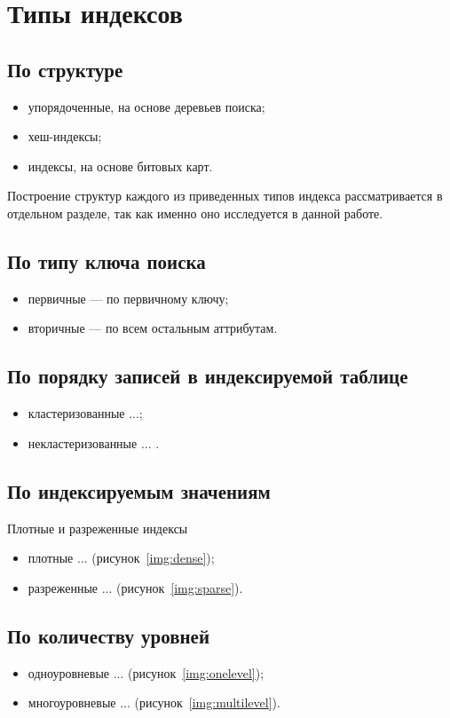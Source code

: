 \section{Типы индексов}

\subsection{По структуре}

\begin{itemize}
    \item упорядоченные, на основе деревьев поиска;
    \item хеш-индексы;
    \item индексы, на основе битовых карт.
\end{itemize}

Построение структур каждого из приведенных типов индекса рассматривается в
отдельном разделе, так как именно оно исследуется в данной работе.

\subsection{По типу ключа поиска}

\begin{itemize}
    \item первичные --- по первичному ключу;
    \item вторичные --- по всем остальным аттрибутам.
\end{itemize}

\subsection{По порядку записей в индексируемой таблице}

\begin{itemize}
    \item кластеризованные ...;
    \item некластеризованные ... .
\end{itemize}

\subsection{По индексируемым значениям}
Плотные и разреженные индексы

\begin{itemize}
    \item плотные ... (рисунок~\ref{img:dense});
    \item разреженные ... (рисунок~\ref{img:sparse}).
\end{itemize}

\subsection{По количеству уровней}

\begin{itemize}
    \item одноуровневые ... (рисунок~\ref{img:onelevel});
    \item многоуровневые ... (рисунок~\ref{img:multilevel}).
\end{itemize}


